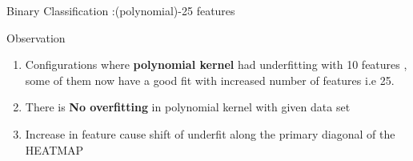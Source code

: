 \documentclass[12pt,t]{beamer}
\begin{document}
\begin{frame}[t]{Binary Classification :(polynomial)-25 features}
    \begin{block}{Observation}
        \begin{enumerate}
            \item Configurations where \textbf{polynomial kernel} had underfitting with 10 features , some 
                of them  now have a good fit with increased number of features i.e 25.
            \item There is \textbf{No overfitting }in polynomial kernel with given data set
            \item Increase in feature cause shift of underfit along the primary diagonal of the HEATMAP
        \end{enumerate}
    \end{block}
\end{frame}


\end{document}
